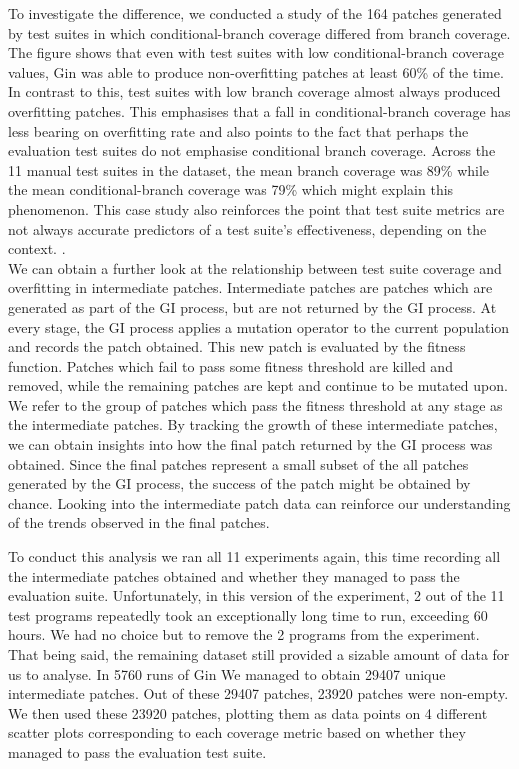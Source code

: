 \documentclass[titlepage]{article}
\begin{document}
To investigate the difference, we conducted a study of the 164 patches generated by test suites in which conditional-branch coverage differed from branch coverage. The figure shows that even with test suites with low conditional-branch coverage values, Gin was able to produce non-overfitting patches at least 60\% of the time. In contrast to this, test suites with low branch coverage almost always produced overfitting patches. This emphasises that a fall in conditional-branch coverage has less bearing on overfitting rate and also points to the fact that perhaps the evaluation test suites do not emphasise conditional branch coverage. Across the 11 manual test suites in the dataset, the mean branch coverage was 89\% while the mean conditional-branch coverage was 79\% which might explain this phenomenon. This case study also reinforces the point that test suite metrics are not always accurate predictors of a test suite’s effectiveness, depending on the context. \cite{coveragenotcorrelated}. \\

We can obtain a further look at the relationship between test suite coverage and overfitting in intermediate patches. Intermediate patches are patches which are generated as part of the GI process, but are not returned by the GI process. At every stage, the GI process applies a mutation operator to the current population and records the patch obtained. This new patch is evaluated by the fitness function. Patches which fail to pass some fitness threshold are killed and removed, while the remaining patches are kept and continue to be mutated upon. We refer to the group of patches which pass the fitness threshold at any stage as the intermediate patches. By tracking the growth of these intermediate patches, we can obtain insights into how the final patch returned by the GI process was obtained. Since the final patches represent a small subset of the all patches generated by the GI process, the success of the patch might be obtained by chance. Looking into the intermediate patch data can reinforce our understanding of the trends observed in the final patches.

To conduct this analysis we ran all 11 experiments again, this time recording all the intermediate patches obtained and whether they managed to pass the evaluation suite. Unfortunately, in this version of the experiment, 2 out of the 11 test programs repeatedly took an exceptionally long time to run, exceeding 60 hours. We had no choice but to remove the 2 programs from the experiment. That being said, the remaining dataset still provided a sizable amount of data for us to analyse. In 5760 runs of Gin We managed to obtain 29407 unique intermediate patches. Out of these 29407 patches, 23920 patches were non-empty. We then used these 23920 patches, plotting them as data points on 4 different scatter plots corresponding to each coverage metric based on whether they managed to pass the evaluation test suite.
\end{document}
